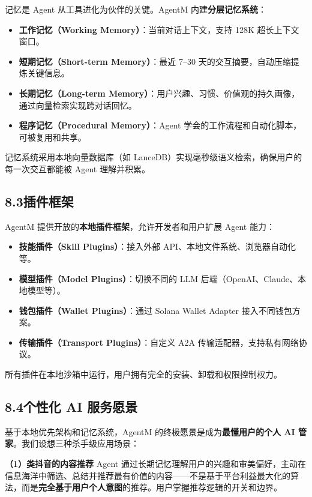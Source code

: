 \documentclass[11pt,a4paper]{article}
\begin{document}
记忆是 Agent 从工具进化为伙伴的关键。AgentM 内建\textbf{分层记忆系统}：
\begin{itemize}[leftmargin=2em]
  \item \textbf{工作记忆（Working Memory）}：当前对话上下文，支持 128K 超长上下文窗口。
  \item \textbf{短期记忆（Short-term Memory）}：最近 7--30 天的交互摘要，自动压缩提炼关键信息。
  \item \textbf{长期记忆（Long-term Memory）}：用户兴趣、习惯、价值观的持久画像，通过向量检索实现跨对话回忆。
  \item \textbf{程序记忆（Procedural Memory）}：Agent 学会的工作流程和自动化脚本，可被复用和共享。
\end{itemize}

记忆系统采用本地向量数据库（如 LanceDB）实现毫秒级语义检索，确保用户的每一次交互都能被 Agent 理解并积累。

\subsection{8.3\quad 插件框架}

AgentM 提供开放的\textbf{本地插件框架}，允许开发者和用户扩展 Agent 能力：
\begin{itemize}[leftmargin=2em]
  \item \textbf{技能插件（Skill Plugins）}：接入外部 API、本地文件系统、浏览器自动化等。
  \item \textbf{模型插件（Model Plugins）}：切换不同的 LLM 后端（OpenAI、Claude、本地模型等）。
  \item \textbf{钱包插件（Wallet Plugins）}：通过 Solana Wallet Adapter 接入不同钱包方案。
  \item \textbf{传输插件（Transport Plugins）}：自定义 A2A 传输适配器，支持私有网络协议。
\end{itemize}

所有插件在本地沙箱中运行，用户拥有完全的安装、卸载和权限控制权力。

\subsection{8.4\quad 个性化 AI 服务愿景}

基于本地优先架构和记忆系统，AgentM 的终极愿景是成为\textbf{最懂用户的个人 AI 管家}。我们设想三种杀手级应用场景：

\textbf{（1）类抖音的内容推荐}
Agent 通过长期记忆理解用户的兴趣和审美偏好，主动在信息海洋中筛选、总结并推荐最有价值的内容——不是基于平台利益最大化的算法，而是\textbf{完全基于用户个人意图}的推荐。用户掌握推荐逻辑的开关和边界。
\end{document}
